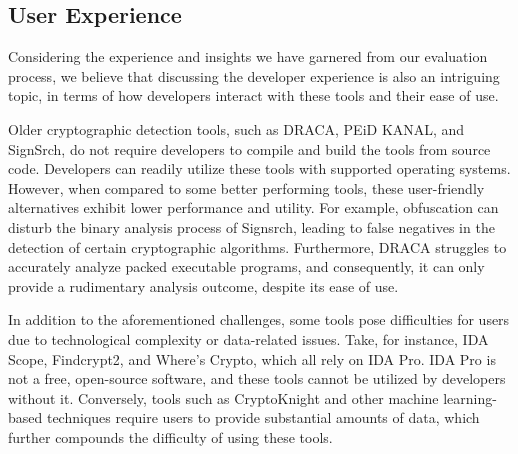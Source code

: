 

\subsection{User Experience}

Considering the experience and insights we have garnered from our evaluation process, we believe that discussing the developer experience is also an intriguing topic, in terms of how developers interact with these tools and their ease of use.

Older cryptographic detection tools, such as DRACA, PEiD KANAL, and SignSrch, do not require developers to compile and build the tools from source code. Developers can readily utilize these tools with supported operating systems. However, when compared to some better performing tools, these user-friendly alternatives exhibit lower performance and utility. For example, obfuscation can disturb the binary analysis process of Signsrch, leading to false negatives in the detection of certain cryptographic algorithms. Furthermore, DRACA struggles to accurately analyze packed executable programs, and consequently, it can only provide a rudimentary analysis outcome, despite its ease of use.

In addition to the aforementioned challenges, some tools pose difficulties for users due to technological complexity or data-related issues. Take, for instance, IDA Scope, Findcrypt2, and Where's Crypto, which all rely on IDA Pro. IDA Pro is not a free, open-source software, and these tools cannot be utilized by developers without it. Conversely, tools such as CryptoKnight and other machine learning-based techniques require users to provide substantial amounts of data, which further compounds the difficulty of using these tools. 

